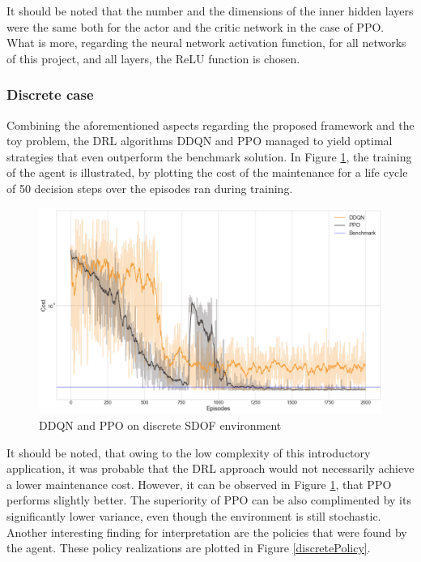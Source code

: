 It should be noted that the number and the dimensions of the inner hidden layers were the same both for the actor and the critic network in the case of \gls{PPO}. What is more, regarding the neural network activation function, for all networks of this project, and all layers, the \gls{ReLU} function is chosen.

\subsubsection{Discrete case}

Combining the aforementioned aspects regarding the proposed framework and the toy problem, the \gls{DRL} algorithms \gls{DDQN} and \gls{PPO} managed to yield optimal strategies that even outperform the benchmark solution. In Figure \ref{discreteAllAlgs}, the training of the agent is illustrated, by plotting the cost of the maintenance for a life cycle of 50 decision steps over the episodes ran during training.

\begin{figure}[H] 
    \centering
	\includegraphics[width=\linewidth]{Figures/discreteAllAlgs.png}
	\caption{\gls{DDQN} and \gls{PPO} on discrete \gls{SDOF} environment}
	\label{discreteAllAlgs}
\end{figure}


It should be noted, that owing to the low complexity of this introductory application, it was probable that the \gls{DRL} approach would not necessarily achieve a lower maintenance cost. However, it can be observed in Figure \ref{discreteAllAlgs}, that \gls{PPO} performs slightly better. The superiority of \gls{PPO} can be also complimented by its significantly lower variance, even though the environment is still stochastic. Another interesting finding for interpretation are the policies that were found by the agent. These policy realizations are plotted in Figure \ref{discretePolicy}.

